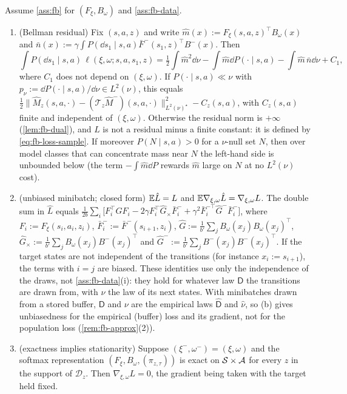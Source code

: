 \begin{proposition}\label{prop:fb-loss}
Assume \cref{ass:fb} for $(F_\xi,B_\omega)$ and \cref{ass:fb-data}.
\begin{enumerate}[nosep,label=(\alph*)]
\item (Bellman residual) Fix $(s,a,z)$ and write $\hat m(x):=F_\xi(s,a,z)^\top B_\omega(x)$ and $\bar n(x):=\gamma\int P(\dd s_1\mid s,a)\bar F^-(s_1,z)^\top B^-(x)$. Then
  \[
  \int P(\dd s_1\mid s,a)\,\ell(\xi,\omega;s,a,s_1,z)=\tfrac12\!\int\hat m^2\dd\nu-\int\hat m\dd P(\cdot\mid s,a)-\int\hat m\,\bar n\dd\nu+C_1,
  \]
  where $C_1$ does not depend on $(\xi,\omega)$.
  If $P(\cdot\mid s,a)\ll\nu$ with $p_\nu:=\dd P(\cdot\mid s,a)/\dd\nu\in L^2(\nu)$, this equals $\tfrac12\|\hat M_z(s,a,\cdot)-(\mathcal T_z\hat M^-)(s,a,\cdot)\|^2_{L^2(\nu)^\star}-C_z(s,a)$, with $C_z(s,a)$ finite and independent of $(\xi,\omega)$.
  Otherwise the residual norm is $+\infty$ (\cref{lem:fb-dual}), and $L$ is not a residual minus a finite constant: it is defined by \eqref{eq:fb-loss-sample}.
  If moreover $P(N\mid s,a)>0$ for a $\nu$-null set $N$, then over model classes that can concentrate mass near $N$ the left-hand side is unbounded below (the term $-\int\hat m\dd P$ rewards $\hat m$ large on $N$ at no $L^2(\nu)$ cost).
\item (unbiased minibatch; closed form) $\mathbb{E}\hat L=L$ and $\mathbb{E}\nabla_{\xi,\omega}\hat L=\nabla_{\xi,\omega}L$.
  The double sum in $\hat L$ equals
  $\frac1{2b}\sum_i\big[F_i^\top\hat GF_i-2\gamma F_i^\top\hat G_\times\bar F^-_i+\gamma^2\bar F_i^{-\top}\hat G^-\bar F^-_i\big]$,
  where $F_i:=F_\xi(s_i,a_i,z_i)$, $\bar F^-_i:=\bar F^-(s_{i+1},z_i)$, $\hat G:=\frac1{b'}\sum_jB_\omega(x_j)B_\omega(x_j)^\top$, $\hat G_\times:=\frac1{b'}\sum_jB_\omega(x_j)B^-(x_j)^\top$ and $\hat G^-:=\frac1{b'}\sum_jB^-(x_j)B^-(x_j)^\top$.
  If the target states are not independent of the transitions (for instance $x_i:=s_{i+1}$), the terms with $i=j$ are biased.
  These identities use only the independence of the draws, not \cref{ass:fb-data}(i): they hold for whatever law $\mathsf D$ the transitions are drawn from, with $\nu$ the law of its next states. With minibatches drawn from a stored buffer, $\mathsf D$ and $\nu$ are the empirical laws $\hat{\mathsf D}$ and $\hat\nu$, so (b) gives unbiasedness for the empirical (buffer) loss and its gradient, not for the population loss (\cref{rem:fb-approx}(2)).
\item (exactness implies stationarity) Suppose $(\xi^-,\omega^-)=(\xi,\omega)$ and the softmax representation $(F_\xi,B_\omega,(\pi_{z,\tau}))$ is exact on $\mathcal{S}\times\mathcal{A}$ for every $z$ in the support of $\mathcal D_z$.
  Then $\nabla_{\xi,\omega}L=0$, the gradient being taken with the target held fixed.
\end{enumerate}
\end{proposition}
